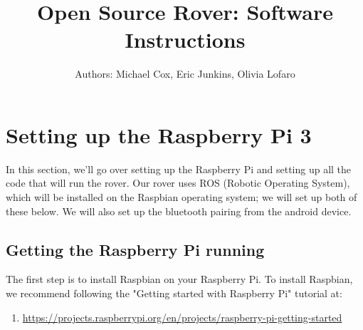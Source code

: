 \documentclass[12pt]{article}
\begin{document}
\title{Open Source Rover: Software Instructions}
\author{Authors: Michael Cox, Eric Junkins, Olivia Lofaro}

\makeatletter         
\def\@maketitle{
\begin{center}	
	\makebox[\textwidth][c]{ \texttt{[image: "Pictures/software title".png]}}
	{\Huge \bfseries \sffamily \@title }\\[3ex] 
	{\Large\sffamily \@author}\\[3ex] 
	\texttt{[image: "Pictures/JPL logo".png]}
\end{center}}
\makeatother

\maketitle


\newpage


\tableofcontents

\newpage


\section{Setting up the Raspberry Pi 3}
In this section, we'll go over setting up the Raspberry Pi and setting up all the code that will run the rover. Our rover uses ROS (Robotic Operating System), which will be installed on the Raspbian operating system; we will set up both of these below.  We will also set up the bluetooth pairing from the android device.

\subsection{Getting the Raspberry Pi running}
The first step is to install Raspbian on your Raspberry Pi. To install Raspbian,
we recommend following the "Getting started with Raspberry Pi" tutorial at:

\begin{enumerate}
	\item[] \href{https://projects.raspberrypi.org/en/projects/raspberry-pi-getting-started}{https://projects.raspberrypi.org/en/projects/raspberry-pi-getting-started}
\end{enumerate}
\end{document}
